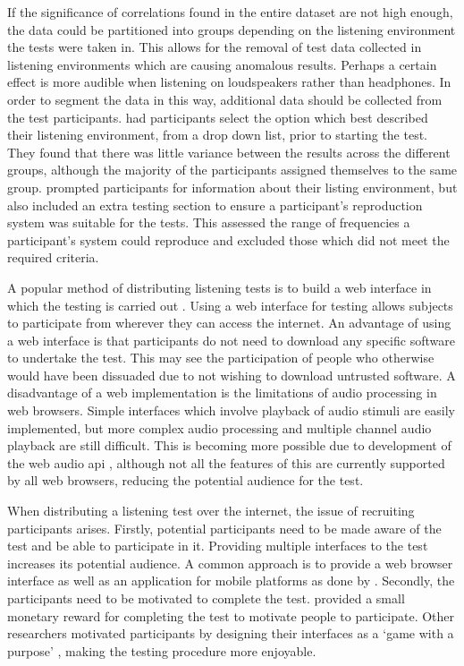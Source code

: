 			If the significance of correlations found in the entire dataset are not high enough, the data could
			be partitioned into groups depending on the listening environment the tests were taken in. This
			allows for the removal of test data collected in listening environments which are causing anomalous
			results. Perhaps a certain effect is more audible when listening on loudspeakers rather than
			headphones. In order to segment the data in this way, additional data should be collected from the
			test participants. \citet{wilmering2013audio} had participants select the option which best
			described their listening environment, from a drop down list, prior to starting the test. They
			found that there was little variance between the results across the different groups, although the
			majority of the participants assigned themselves to the same group.
			\citet{seetharaman2014crowdsourcing} prompted participants for information about their listing
			environment, but also included an extra testing section to ensure a participant's reproduction
			system was suitable for the tests. This assessed the range of frequencies a participant's system
			could reproduce and excluded those which did not meet the required criteria.
			
			A popular method of distributing listening tests is to build a web interface in which the testing
			is carried out \citep{wilmering2013audio, cartwright2013socialeq, seetharaman2014crowdsourcing}.
			Using a web interface for testing allows subjects to participate from wherever they can access the
			internet. An advantage of using a web interface is that participants do not need to download any
			specific software to undertake the test. This may see the participation of people who otherwise
			would have been dissuaded due to not wishing to download untrusted software. A disadvantage of a
			web implementation is the limitations of audio processing in web browsers. Simple interfaces which
			involve playback of audio stimuli are easily implemented, but more complex audio processing and
			multiple channel audio playback are still difficult. This is becoming more possible due to
			development of the web audio \acrshort{api} \citep{adenot2015web}, although not all the features of
			this are currently supported by all web browsers, reducing the potential audience for the test.

			When distributing a listening test over the internet, the issue of recruiting participants arises.
			Firstly, potential participants need to be made aware of the test and be able to participate in it.
			Providing multiple interfaces to the test increases its potential audience. A common approach is to
			provide a web browser interface as well as an application for mobile platforms as done by
			\citet{huq2010crowdsourcing}. Secondly, the participants need to be motivated to complete the test.
			\citet{cartwright2013socialeq} provided a small monetary reward for completing the test to motivate
			people to participate. Other researchers motivated participants by designing their interfaces as a
			`game with a purpose' \citep{law2007tagatune, huq2010crowdsourcing, burgoyne2013hooked,
			wolff2014spot}, making the testing procedure more enjoyable.

